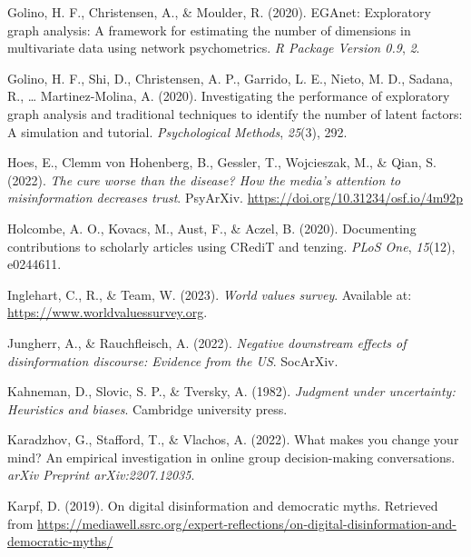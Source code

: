 \documentclass[
  ,jou,floatsintext]{apa6}
\newlength{\cslhangindent}
\newlength{\cslentryspacingunit} %
\newenvironment{CSLReferences}[2] %
 {%
  \setlength{\parindent}{0pt}
  \ifodd #1
  \let\oldpar\par
  \def\par{\hangindent=\cslhangindent\oldpar}
  \fi
  \setlength{\parskip}{#2\cslentryspacingunit}
 }%
 {}
\begin{document}
\begin{CSLReferences}{1}{0}
\leavevmode{}%
Golino, H. F., Christensen, A., \& Moulder, R. (2020). EGAnet: Exploratory graph analysis: A framework for estimating the number of dimensions in multivariate data using network psychometrics. \emph{R Package Version 0.9}, \emph{2}.

\leavevmode{}%
Golino, H. F., Shi, D., Christensen, A. P., Garrido, L. E., Nieto, M. D., Sadana, R., \ldots{} Martinez-Molina, A. (2020). Investigating the performance of exploratory graph analysis and traditional techniques to identify the number of latent factors: A simulation and tutorial. \emph{Psychological Methods}, \emph{25}(3), 292.

\leavevmode{}%
Hoes, E., Clemm von Hohenberg, B., Gessler, T., Wojcieszak, M., \& Qian, S. (2022). \emph{The cure worse than the disease? How the media's attention to misinformation decreases trust}. PsyArXiv. \url{https://doi.org/10.31234/osf.io/4m92p}

\leavevmode{}%
Holcombe, A. O., Kovacs, M., Aust, F., \& Aczel, B. (2020). Documenting contributions to scholarly articles using CRediT and tenzing. \emph{PLoS One}, \emph{15}(12), e0244611.

\leavevmode{}%
Inglehart, C., R., \& Team, W. (2023). \emph{World values survey}. Available at: \url{https://www.worldvaluessurvey.org}.

\leavevmode{}%
Jungherr, A., \& Rauchfleisch, A. (2022). \emph{Negative downstream effects of disinformation discourse: Evidence from the US}. SocArXiv.

\leavevmode{}%
Kahneman, D., Slovic, S. P., \& Tversky, A. (1982). \emph{Judgment under uncertainty: Heuristics and biases}. Cambridge university press.

\leavevmode{}%
Karadzhov, G., Stafford, T., \& Vlachos, A. (2022). What makes you change your mind? An empirical investigation in online group decision-making conversations. \emph{arXiv Preprint arXiv:2207.12035}.

\leavevmode{}%
Karpf, D. (2019). On digital disinformation and democratic myths. Retrieved from \url{https://mediawell.ssrc.org/expert-reflections/on-digital-disinformation-and-democratic-myths/}


\end{CSLReferences}
\end{document}
